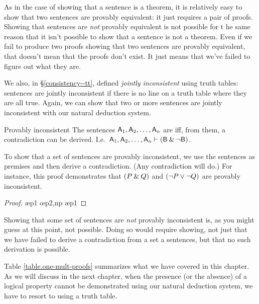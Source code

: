 As in the case of showing that a sentence is a theorem, it is relatively easy to show that two sentences are provably equivalent: it just requires a pair of proofs. Showing that sentences are \emph{not} provably equivalent is not possible for t he same reason that it isn't possible to show that a sentence is not a theorem. Even if we fail to produce two proofs showing that two sentences are provably equivalent, that doesn't mean that the proofs don't exist. It just means that we've failed to figure out what they are. 

We also, in \S\ref{consistency--tt}, defined \textit{jointly inconsistent} using truth tables: sentences are jointly inconsistent if there is no line on a truth table where they are all true. Again, we can show that two or more sentences are jointly inconsistent with our natural deduction system. 

\begin{factboxy}{Provably inconsistent}
The sentences $\mathsf{A}_1,\mathsf{A}_2,\ldots, \mathsf{A}_n$ are  iff, from them, a contradiction can be derived. I.e.\ $\mathsf{A}_1,\mathsf{A}_2,\ldots, \mathsf{A}_n \vdash (\mathsf{B} \mathbin{\&} {\neg} \mathsf{B})$.
\end{factboxy}
        
To show that a set of sentences are provably inconsistent, we use the sentences as premises and then derive a contradiction. (Any contradiction will do.) For instance, this proof demonstrates that $(P \mathbin{\&} Q)$ and $({\neg} P \vee {\neg} Q)$ are provably inconsistent.

	\begin{proof}
	 \pr{}
	 \pr{}
	 \ae{p1}
	 
	 \oe{p2,np}
	 \ae{p1}
	 
	\end{proof}

Showing that some set of sentences are \textit{not} provably inconsistent is, as you might guess at this point, not possible. Doing so would require showing, not just that we have failed to derive a contradiction from a set a sentences, but that no such derivation is possible.

Table \ref{table.one-mult-proofs} summarizes what we have covered in this chapter. As we will discuss in the next chapter, when the presence (or the absence) of a logical property cannot be demonstrated using our natural deduction system, we have to resort to using a truth table.

